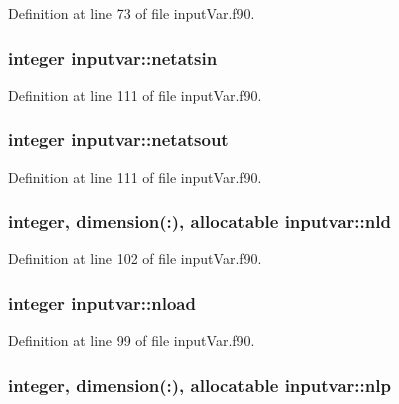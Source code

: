 Definition at line 73 of file input\-Var.\-f90.

\hypertarget{classinputvar_accdc85c467baf46e33e1237e719ad174}{
\subsubsection[{netatsin}]{\setlength{\rightskip}{0pt plus 5cm}integer inputvar\-::netatsin}}\label{classinputvar_accdc85c467baf46e33e1237e719ad174}


Definition at line 111 of file input\-Var.\-f90.

\hypertarget{classinputvar_ac0b8841a56f7e91ebd3c2878d4499c2b}{
\subsubsection[{netatsout}]{\setlength{\rightskip}{0pt plus 5cm}integer inputvar\-::netatsout}}\label{classinputvar_ac0b8841a56f7e91ebd3c2878d4499c2b}


Definition at line 111 of file input\-Var.\-f90.

\hypertarget{classinputvar_a8c5a23a5a519fb86c67fc1465aef0e33}{
\subsubsection[{nld}]{\setlength{\rightskip}{0pt plus 5cm}integer, dimension(\-:), allocatable inputvar\-::nld}}\label{classinputvar_a8c5a23a5a519fb86c67fc1465aef0e33}


Definition at line 102 of file input\-Var.\-f90.

\hypertarget{classinputvar_ac924c0b7af6a3dbae99f1a60dc9242ab}{
\subsubsection[{nload}]{\setlength{\rightskip}{0pt plus 5cm}integer inputvar\-::nload}}\label{classinputvar_ac924c0b7af6a3dbae99f1a60dc9242ab}


Definition at line 99 of file input\-Var.\-f90.

\hypertarget{classinputvar_a3f2f71983b35bd63596385392671f89d}{
\subsubsection[{nlp}]{\setlength{\rightskip}{0pt plus 5cm}integer, dimension(\-:), allocatable inputvar\-::nlp}}\label{classinputvar_a3f2f71983b35bd63596385392671f89d}


